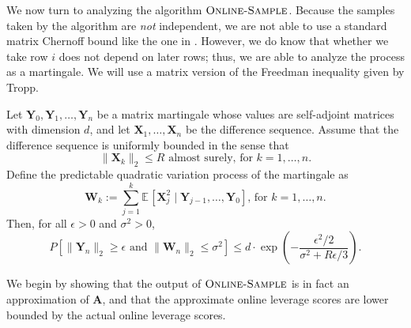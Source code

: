 \documentclass{toc}
\newcommand{\bv}[1]{\mathbf{#1}}
\newcommand{\norm}[1]{\|#1\|}
\newcommand{\expct}[3]{\mathbb{E}_{{#1}_{#2}}\left[#3\right]}
\newcommand{\prob}[1]{P\left[#1\right]}
\begin{document}
We now turn to analyzing the algorithm $\textsc{Online-Sample}$.
Because the samples taken by the algorithm are \emph{not} independent, we are not able to use a standard matrix Chernoff bound
like the one in .
However, we do know that whether we take row $i$ does not depend on 
later rows; thus, we are able to analyze the process as a martingale.
We will use a matrix version of the Freedman inequality given by Tropp.

\begin{theorem}
    \label{thm:matrix_freedman}
    Let $\bv{Y}_0, \bv{Y}_1, \ldots, \bv{Y}_n$ be a matrix martingale whose values are self-adjoint matrices with dimension $d$, and let $\bv{X}_1, \ldots, \bv{X}_n$ be the difference sequence.
    Assume that the difference sequence is uniformly bounded in the sense that
    $$
        \norm{\bv{X}_k}_2 \leq R\mbox{ almost surely, for } k = 1, \ldots, n.
    $$
    Define the predictable quadratic variation process of the
    martingale as
    $$
        \bv{W}_k := \sum_{j=1}^k \expct{}{}{\bv{X}_j^2 \mid \bv{Y}_{j-1},\ldots, \bv{Y}_0}\mbox{, for }k = 1, \ldots, n.
    $$
    Then, for all $\epsilon > 0$ and $\sigma^2 > 0$,
    $$
        \prob{\norm{\bv{Y}_n}_2 \geq \epsilon\mbox{ and } \norm{\bv{W}_n}_2 \leq \sigma^2} \leq d\cdot\exp\left(-\frac{\epsilon^2/2}{\sigma^2+R\epsilon/3}\right).
    $$
\end{theorem}

We begin by showing that the output of $\textsc{Online-Sample}$ is in fact an approximation of $\bv{A}$, and that the approximate online leverage scores are lower bounded by the actual online leverage scores.
\end{document}
